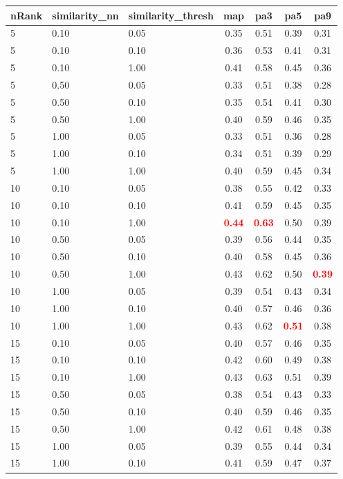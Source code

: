\begin{tabular}{lllcccc} 
nRank & similarity\_nn & similarity\_thresh & map & pa3 & pa5 & pa9 \\ 
\hline 
 5 & 0.10 & 0.05 & 0.35 & 0.51 & 0.39 & 0.31 \\ 
 5 & 0.10 & 0.10 & 0.36 & 0.53 & 0.41 & 0.31 \\ 
 5 & 0.10 & 1.00 & 0.41 & 0.58 & 0.45 & 0.36 \\ 
 5 & 0.50 & 0.05 & 0.33 & 0.51 & 0.38 & 0.28 \\ 
 5 & 0.50 & 0.10 & 0.35 & 0.54 & 0.41 & 0.30 \\ 
 5 & 0.50 & 1.00 & 0.40 & 0.59 & 0.46 & 0.35 \\ 
 5 & 1.00 & 0.05 & 0.33 & 0.51 & 0.36 & 0.28 \\ 
 5 & 1.00 & 0.10 & 0.34 & 0.51 & 0.39 & 0.29 \\ 
 5 & 1.00 & 1.00 & 0.40 & 0.59 & 0.45 & 0.34 \\ 
10 & 0.10 & 0.05 & 0.38 & 0.55 & 0.42 & 0.33 \\ 
10 & 0.10 & 0.10 & 0.41 & 0.59 & 0.45 & 0.35 \\ 
10 & 0.10 & 1.00 & \textbf{\textcolor{red}{0.44}} & \textbf{\textcolor{red}{0.63}} & 0.50 & 0.39 \\ 
10 & 0.50 & 0.05 & 0.39 & 0.56 & 0.44 & 0.35 \\ 
10 & 0.50 & 0.10 & 0.40 & 0.58 & 0.45 & 0.36 \\ 
10 & 0.50 & 1.00 & 0.43 & 0.62 & 0.50 & \textbf{\textcolor{red}{0.39}} \\ 
10 & 1.00 & 0.05 & 0.39 & 0.54 & 0.43 & 0.34 \\ 
10 & 1.00 & 0.10 & 0.40 & 0.57 & 0.46 & 0.36 \\ 
10 & 1.00 & 1.00 & 0.43 & 0.62 & \textbf{\textcolor{red}{0.51}} & 0.38 \\ 
15 & 0.10 & 0.05 & 0.40 & 0.57 & 0.46 & 0.35 \\ 
15 & 0.10 & 0.10 & 0.42 & 0.60 & 0.49 & 0.38 \\ 
15 & 0.10 & 1.00 & 0.43 & 0.63 & 0.51 & 0.39 \\ 
15 & 0.50 & 0.05 & 0.38 & 0.54 & 0.43 & 0.33 \\ 
15 & 0.50 & 0.10 & 0.40 & 0.59 & 0.46 & 0.35 \\ 
15 & 0.50 & 1.00 & 0.42 & 0.61 & 0.48 & 0.38 \\ 
15 & 1.00 & 0.05 & 0.39 & 0.55 & 0.44 & 0.34 \\ 
15 & 1.00 & 0.10 & 0.41 & 0.59 & 0.47 & 0.37 \\ 

\end{tabular}
